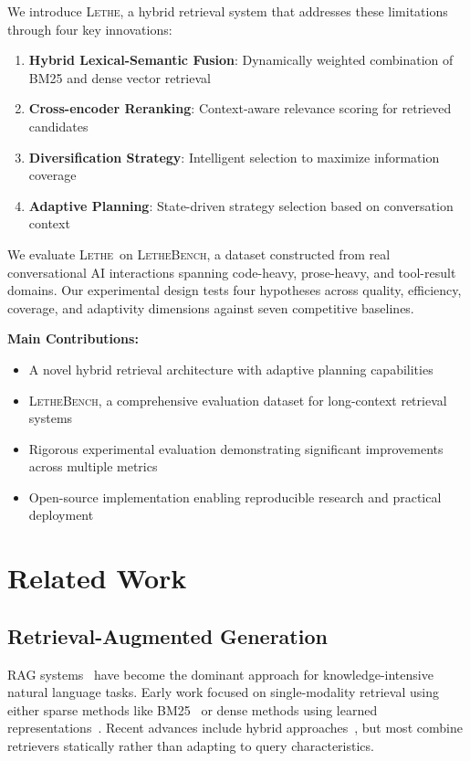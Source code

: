 \documentclass[letterpaper]{article}
\newcommand{\lethe}{\textsc{Lethe}}
\newcommand{\lethebench}{\textsc{LetheBench}}
\begin{document}
We introduce \lethe, a hybrid retrieval system that addresses these limitations through four key innovations:

\begin{enumerate}
    \item \textbf{Hybrid Lexical-Semantic Fusion}: Dynamically weighted combination of BM25 and dense vector retrieval
    \item \textbf{Cross-encoder Reranking}: Context-aware relevance scoring for retrieved candidates
    \item \textbf{Diversification Strategy}: Intelligent selection to maximize information coverage
    \item \textbf{Adaptive Planning}: State-driven strategy selection based on conversation context
\end{enumerate}

We evaluate \lethe\ on \lethebench, a dataset constructed from real conversational AI interactions spanning code-heavy, prose-heavy, and tool-result domains. Our experimental design tests four hypotheses across quality, efficiency, coverage, and adaptivity dimensions against seven competitive baselines.

\textbf{Main Contributions:}
\begin{itemize}
    \item A novel hybrid retrieval architecture with adaptive planning capabilities
    \item \lethebench, a comprehensive evaluation dataset for long-context retrieval systems  
    \item Rigorous experimental evaluation demonstrating significant improvements across multiple metrics
    \item Open-source implementation enabling reproducible research and practical deployment
\end{itemize}

\section{Related Work}

\subsection{Retrieval-Augmented Generation}

RAG systems~\citep{lewis2020retrieval} have become the dominant approach for knowledge-intensive natural language tasks. Early work focused on single-modality retrieval using either sparse methods like BM25~\citep{robertson2009probabilistic} or dense methods using learned representations~\citep{karpukhin2020dense}. Recent advances include hybrid approaches~\citep{ma2023finedtuning}, but most combine retrievers statically rather than adapting to query characteristics.
\end{document}

